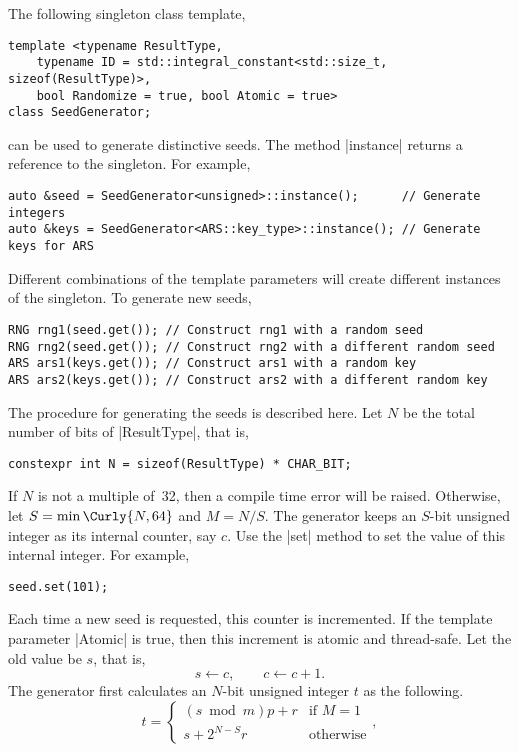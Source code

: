 The following singleton class template,
\begin{verbatim}
template <typename ResultType,
    typename ID = std::integral_constant<std::size_t, sizeof(ResultType)>,
    bool Randomize = true, bool Atomic = true>
class SeedGenerator;
\end{verbatim}
can be used to generate distinctive seeds. The method |instance| returns a
reference to the singleton. For example,
\begin{verbatim}
auto &seed = SeedGenerator<unsigned>::instance();      // Generate integers
auto &keys = SeedGenerator<ARS::key_type>::instance(); // Generate keys for ARS
\end{verbatim}
Different combinations of the template parameters will create different
instances of the singleton. To generate new seeds,
\begin{verbatim}
RNG rng1(seed.get()); // Construct rng1 with a random seed
RNG rng2(seed.get()); // Construct rng2 with a different random seed
ARS ars1(keys.get()); // Construct ars1 with a random key
ARS ars2(keys.get()); // Construct ars2 with a different random key
\end{verbatim}
The procedure for generating the seeds is described here. Let $N$ be the total
number of bits of |ResultType|, that is,
\begin{verbatim}
constexpr int N = sizeof(ResultType) * CHAR_BIT;
\end{verbatim}
If $N$ is not a multiple of~32, then a compile time error will be raised.
Otherwise, let $S = \min\Curly{N,64}$ and $M = N / S$. The generator keeps an
$S$-bit unsigned integer as its internal counter, say $c$. Use the |set| method
to set the value of this internal integer. For example,
\begin{verbatim}
seed.set(101);
\end{verbatim}
Each time a new seed is requested, this counter is incremented. If the template
parameter |Atomic| is true, then this increment is atomic and thread-safe. Let
the old value be $s$, that is,
\begin{equation*}
  s \leftarrow c,\qquad c \leftarrow c + 1.
\end{equation*}
The generator first calculates an $N$-bit unsigned integer $t$ as the
following.
\begin{equation*}
  t = \begin{cases}
    (s \bmod m) p + r &\text{if } M = 1 \\
    s + 2^{N - S}r    &\text{otherwise}
  \end{cases},
\end{equation*}
